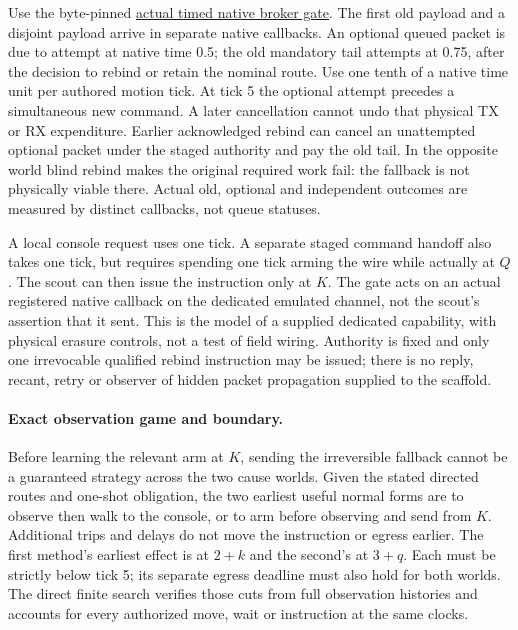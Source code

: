 \documentclass[11pt]{article}
\begin{document}
Use the byte-pinned
\href{https://github.com/eternal-november/eos-research-programmes/pull/589}
{actual timed native broker gate}. The first old payload and a
disjoint payload arrive in separate native callbacks. An
optional queued packet is due to attempt at native time 0.5;
the old mandatory tail attempts at 0.75, after the decision
to rebind or retain the nominal route. Use one tenth of a
native time unit per authored motion tick. At tick 5 the
optional attempt precedes a simultaneous new command. A later
cancellation cannot undo that physical TX or RX expenditure.
Earlier acknowledged rebind can cancel an unattempted optional
packet under the staged authority and pay the old tail.
In the opposite world blind rebind makes the original required
work fail: the fallback is not physically viable there. Actual
old, optional and independent outcomes are measured by distinct
callbacks, not queue statuses.

A local console request uses one tick. A separate staged
command handoff also takes one tick, but requires spending
one tick arming the wire while actually at $Q$. The scout can
then issue the instruction only at $K$. The gate acts on an
actual registered native callback on the dedicated emulated
channel, not the scout's assertion that it sent. This is the
model of a supplied dedicated capability, with physical erasure
controls, not a test of field wiring. Authority is fixed and
only one irrevocable qualified rebind instruction may be issued;
there is no reply, recant, retry or observer of hidden packet
propagation supplied to the scaffold.

\paragraph{Exact observation game and boundary.}
Before learning the relevant arm at $K$, sending the
irreversible fallback cannot be a guaranteed strategy across
the two cause worlds. Given the stated directed routes and
one-shot obligation, the two earliest useful normal forms
are to observe then walk to the console, or to arm before
observing and send from $K$. Additional trips and delays do
not move the instruction or egress earlier. The first
method's earliest effect is at $2+k$ and the second's at
$3+q$. Each must be strictly below tick 5; its separate
egress deadline must also hold for both worlds.
The direct finite search verifies those cuts from full
observation histories and accounts for every authorized
move, wait or instruction at the same clocks.
\end{document}
